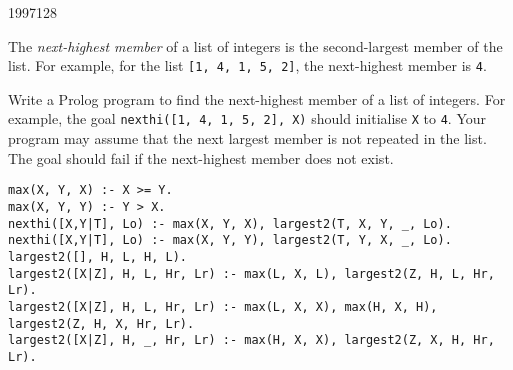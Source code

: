\documentclass[10pt,\jkfside,a4paper]{article}
\begin{document}
\begin{examquestion}{1997}{12}{8}

The \textit{next-highest member} of a list of integers is the second-largest 
member of the list. For example, for the list \texttt{[1, 4, 1, 5, 2]}, the 
next-highest member is \texttt{4}.

Write a Prolog program to find the next-highest member of a list of integers. 
For example, the goal \texttt{nexthi([1, 4, 1, 5, 2], X)} should initialise 
\texttt{X} to \texttt{4}. Your program may assume that the next largest 
member is not repeated in the list. The goal should fail if the next-highest 
member does not exist.

\begin{lstlisting}[style=pstyle]
max(X, Y, X) :- X >= Y.
max(X, Y, Y) :- Y > X.
nexthi([X,Y|T], Lo) :- max(X, Y, X), largest2(T, X, Y, _, Lo).
nexthi([X,Y|T], Lo) :- max(X, Y, Y), largest2(T, Y, X, _, Lo).
largest2([], H, L, H, L).
largest2([X|Z], H, L, Hr, Lr) :- max(L, X, L), largest2(Z, H, L, Hr, Lr).
largest2([X|Z], H, L, Hr, Lr) :- max(L, X, X), max(H, X, H), largest2(Z, H, X, Hr, Lr).
largest2([X|Z], H, _, Hr, Lr) :- max(H, X, X), largest2(Z, X, H, Hr, Lr).
\end{lstlisting}

\end{examquestion}
\end{document}
